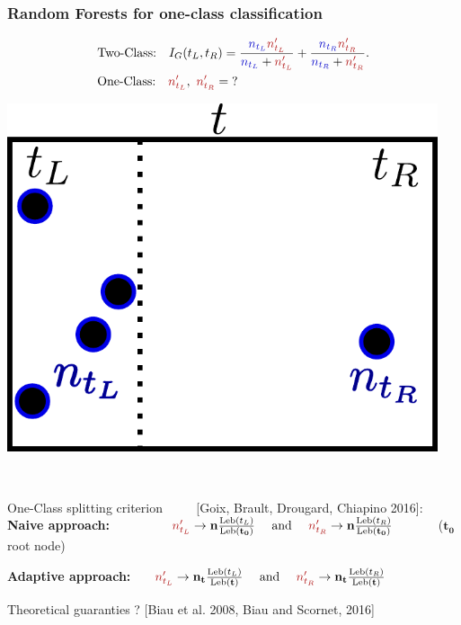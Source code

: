 \documentclass[9pt]{beamer}
\newcommand\red{\color{red} }
\newcommand\blue{\color{blue} }
\def\mb{\mathbf}
\def\leb{\text{Leb}}
\begin{document}
\begin{frame}
\frametitle{Random Forests for one-class classification}


\begin{minipage}{0.65\textwidth}
\begin{align*}
&\text{Two-Class:}~~~
I_G(t_L, t_R)= \frac{{\blue n_{t_L}} {\red n'_{t_L}}}{{\blue n_{t_L}} +  {\red n'_{t_L}}} + \frac{{\blue n_{t_R}} {\red n'_{t_R}}}{{\blue n_{t_R}} +  {\red n'_{t_R}}}.\\
&\text{One-Class:}~~~ {\red n'_{t_L}},~ {\red n'_{t_R}} = \text{?}
\end{align*}

\end{minipage}
\begin{minipage}{0.3\textwidth}
	\centering
	\includegraphics[width=0.95\textwidth]{sourcefigs/tree_oc.pdf}
\end{minipage}
\
\begin{exampleblock}{One-Class splitting criterion ~~~~{\color{black} \small [Goix, Brault, Drougard, Chiapino 2016]:}}
\textbf{Naive approach:} ~~~~~~~~~${\red n'_{t_L}} \to {\mb n} \frac{\leb(t_L)}{\leb(\mb{t_{0}})} ~~~~\text{and}~~~~ {\red n'_{t_R}} \to \mb n \frac{\leb(t_R)}{\leb(\mb{t_{0}})}$~~~~~~~($\mb{t_0}$ root node)

\textbf{Adaptive approach:}~~~
${\red n'_{t_L}} \to \mb{n_{t}} \frac{\leb(t_L)}{\leb(\mb t)} ~~~~\text{and}~~~~
{\red n'_{t_R}} \to \mb{n_{t}} \frac{\leb(t_R)}{\leb(\mb t)}
$


\end{exampleblock}
%
Theoretical guaranties ?
{\small [Biau et al. 2008, Biau and Scornet, 2016]}

\end{frame}
\end{document}
